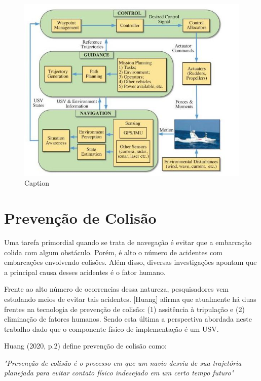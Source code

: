         \begin{figure}
            \centering
            \includegraphics{fig/gnc_system.jpg}
            \caption{Caption}
            \label{fig:gnc_system}
        \end{figure}
    
    
    \section{Prevenção de Colisão}\label{subchap2:prev_col}
        Uma tarefa primordial quando se trata de navegação é evitar que a embarcação colida com algum obstáculo. Porém, é alto o número de acidentes com embarcações envolvendo colisões. Além disso, diversas investigações apontam que a principal causa desses acidentes é o fator humano.~\cite{HUANG2020451}
        
        Frente ao alto número de ocorrencias dessa natureza, pesquisadores vem estudando meios de evitar tais acidentes. [Huang] afirma que atualmente há duas frentes na tecnologia de prevenção de colisão: (1) assitência à tripulação e (2) eliminação de fatores humanos. Sendo esta última a perspectiva abordada neste trabalho dado que o componente físico de implementação é um USV.~\cite{HUANG2020451}
        
        Huang (2020, p.2) define prevenção de colisão como:
        \begin{directcite}
            \textit{"Prevenção de colisão é o processo em que um navio desvia de sua trajetória planejada para evitar contato físico indesejado em um certo tempo futuro"}
        \end{directcite}
        
